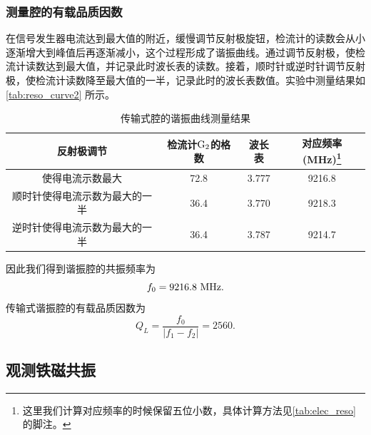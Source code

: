 \documentclass[font=default]{mpltx}
\begin{document}
\subsubsection{测量腔的有载品质因数}
在信号发生器电流达到最大值的附近，缓慢调节反射极旋钮，检流计的读数会从小逐渐增大到峰值后再逐渐减小，这个过程形成了谐振曲线。通过调节反射极，使检流计读数达到最大值，并记录此时波长表的读数。接着，顺时针或逆时针调节反射极，使检流计读数降至最大值的一半，记录此时的波长表数值。实验中测量结果如\autoref{tab:reso_curve2} 所示。
\begin{table}[h]
  \label{tab:reso_curve2}
  \caption{传输式腔的谐振曲线测量结果}
  \vspace{0.2cm}
  \begin{tabular}{c|c|c|c}
    \hline
  反射极调节           & 检流计$\rm G_2$的格数 & 波长表   & 对应频率(MHz)\footnote{这里我们计算对应频率的时候保留五位小数，具体计算方法见\autoref{tab:elec_reso} 的脚注。} \\\hline\hline
  使得电流示数最大        & 72.8  & 3.777 & 9216.8 \\\hline
  顺时针使得电流示数为最大的一半 & 36.4  & 3.770 & 9218.3 \\\hline
  逆时针使得电流示数为最大的一半 & 36.4  & 3.787 & 9214.7 \\\hline
  \end{tabular}
\end{table}

因此我们得到谐振腔的共振频率为$$f_0=9216.8\ \rm MHz.$$
传输式谐振腔的有载品质因数为$$Q_L=\frac{f_0}{|f_1-f_2|}=2560.$$
\subsection{观测铁磁共振}
\end{document}
